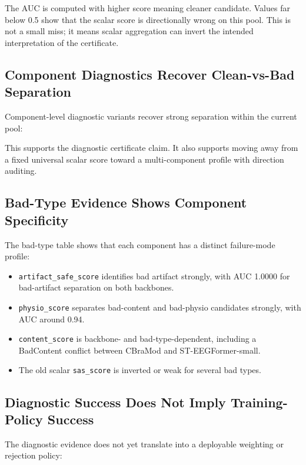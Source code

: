 \documentclass[11pt]{article}
\begin{document}
The AUC is computed with higher score meaning cleaner candidate. Values far below 0.5 show that the scalar score is directionally wrong on this pool. This is not a small miss; it means scalar aggregation can invert the intended interpretation of the certificate.

\subsection{Component Diagnostics Recover Clean-vs-Bad Separation}

Component-level diagnostic variants recover strong separation within the current pool:



This supports the diagnostic certificate claim. It also supports moving away from a fixed universal scalar score toward a multi-component profile with direction auditing.

\subsection{Bad-Type Evidence Shows Component Specificity}

The bad-type table shows that each component has a distinct failure-mode profile:

\begin{itemize}
\item \texttt{artifact\_safe\_score} identifies bad artifact strongly, with AUC 1.0000 for bad-artifact separation on both backbones.
\item \texttt{physio\_score} separates bad-content and bad-physio candidates strongly, with AUC around 0.94.
\item \texttt{content\_score} is backbone- and bad-type-dependent, including a BadContent conflict between CBraMod and ST-EEGFormer-small.
\item The old scalar \texttt{sas\_score} is inverted or weak for several bad types.
\end{itemize}

\subsection{Diagnostic Success Does Not Imply Training-Policy Success}

The diagnostic evidence does not yet translate into a deployable weighting or rejection policy:


\end{document}
